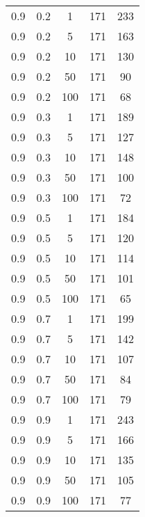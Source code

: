 \begin{appendices}
\begin{longtable}{|c|c|c|c|c|}
		0.9 & 0.2 & 1   & 171 & 233 \\
		0.9 & 0.2 & 5   & 171 & 163 \\
		0.9 & 0.2 & 10  & 171 & 130 \\
		0.9 & 0.2 & 50  & 171 & 90  \\
		0.9 & 0.2 & 100 & 171 & 68  \\ \hline
		0.9 & 0.3 & 1   & 171 & 189 \\
		0.9 & 0.3 & 5   & 171 & 127 \\
		0.9 & 0.3 & 10  & 171 & 148 \\
		0.9 & 0.3 & 50  & 171 & 100 \\
		0.9 & 0.3 & 100 & 171 & 72  \\ \hline
		0.9 & 0.5 & 1   & 171 & 184 \\
		0.9 & 0.5 & 5   & 171 & 120 \\
		0.9 & 0.5 & 10  & 171 & 114 \\
		0.9 & 0.5 & 50  & 171 & 101 \\
		0.9 & 0.5 & 100 & 171 & 65  \\ \hline
		0.9 & 0.7 & 1   & 171 & 199 \\
		0.9 & 0.7 & 5   & 171 & 142 \\
		0.9 & 0.7 & 10  & 171 & 107 \\
		0.9 & 0.7 & 50  & 171 & 84  \\
		0.9 & 0.7 & 100 & 171 & 79  \\ \hline
		0.9 & 0.9 & 1   & 171 & 243 \\
		0.9 & 0.9 & 5   & 171 & 166 \\
		0.9 & 0.9 & 10  & 171 & 135 \\
		0.9 & 0.9 & 50  & 171 & 105 \\
		0.9 & 0.9 & 100 & 171 & 77 \\ \hline
	\end{longtable}
	

\end{appendices}
